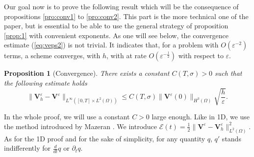 \documentclass[a4paper,french,english,10pt]{article}
\newcommand\eps{\varepsilon}
\newcommand\V{\mathbf{V}}
\newtheorem{proposition}[theorem]{Proposition}
\begin{document}
Our goal now is to prove the following result 
which will be the consequence
of propositions \ref{pro:conv1} to \ref{pro:conv2}.
This part is the more technical one of the paper, but is essential
to be able to use the general strategy of proposition
\ref{prop:1} with convenient exponents. 
As one will see below, the convergence estimate
(\ref{eq:veps2}) is not trivial. It indicates that, 
for a problem with $O(\varepsilon^{-2})$ terms, a scheme 
converges, with $h$, with  at rate $O(\varepsilon^{-\frac12})$ with respect to
$\eps$.

\begin{proposition}[Convergence]\label{ein_prosit}
There exists a constant $C(T, \sigma)>0$ 
      such that the following estimate holds
\begin{equation} \label{eq:veps2}
\|\V^{\eps}_h-\V^{\eps}\|_{L^\infty( [0,T]\times L^2  (\Omega) )}\leq
C(T, \sigma)\|  \mathbf V ^\eps (0) \|_  { H^3(\Omega)  }
\sqrt{\frac h \eps}.
\end{equation}
\end{proposition}
In the whole proof, we will use a constant $C>0$ large enough.
 Like in 1D, we use the method introduced by Mazeran \cite{Mazeran}. 
We introduce
$\mathscr{E}(t)=\frac12 \|\V^{\eps}-\V^{\eps}_h\|_{L^2(\Omega)}^2$.
As for the 1D proof and for the sake of simplicity, for any quantity $q$,   $q'$ stands indifferently for  $\frac{d}{dt}q $ or $\partial_t q $.
\end{document}
